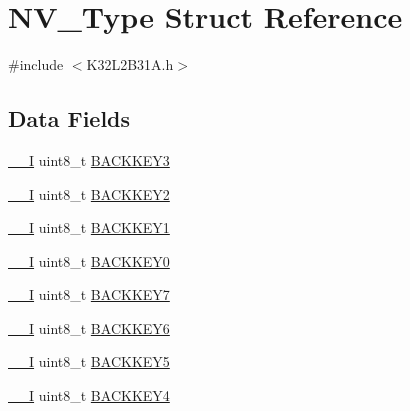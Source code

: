 \hypertarget{struct_n_v___type}{}\section{N\+V\+\_\+\+Type Struct Reference}
\label{struct_n_v___type}


{\ttfamily \#include $<$K32\+L2\+B31\+A.\+h$>$}

\subsection*{Data Fields}
\begin{DoxyCompactItemize}
\item 
\mbox{\hyperlink{core__cm0plus_8h_af63697ed9952cc71e1225efe205f6cd3}{\+\_\+\+\_\+I}} uint8\+\_\+t \mbox{\hyperlink{struct_n_v___type_a7d27c275caa809e8b950cb9fb1f52ea5}{B\+A\+C\+K\+K\+E\+Y3}}
\item 
\mbox{\hyperlink{core__cm0plus_8h_af63697ed9952cc71e1225efe205f6cd3}{\+\_\+\+\_\+I}} uint8\+\_\+t \mbox{\hyperlink{struct_n_v___type_ae0ad5dd66c2109955a90e1a6f4720a43}{B\+A\+C\+K\+K\+E\+Y2}}
\item 
\mbox{\hyperlink{core__cm0plus_8h_af63697ed9952cc71e1225efe205f6cd3}{\+\_\+\+\_\+I}} uint8\+\_\+t \mbox{\hyperlink{struct_n_v___type_a42fa40dda0fa3aee0b861bdf6ffa1eae}{B\+A\+C\+K\+K\+E\+Y1}}
\item 
\mbox{\hyperlink{core__cm0plus_8h_af63697ed9952cc71e1225efe205f6cd3}{\+\_\+\+\_\+I}} uint8\+\_\+t \mbox{\hyperlink{struct_n_v___type_aa0da3d6ede3a90b0697a300ddf18cd65}{B\+A\+C\+K\+K\+E\+Y0}}
\item 
\mbox{\hyperlink{core__cm0plus_8h_af63697ed9952cc71e1225efe205f6cd3}{\+\_\+\+\_\+I}} uint8\+\_\+t \mbox{\hyperlink{struct_n_v___type_ae3df2dcb7a5f33570f8cc15cc8126810}{B\+A\+C\+K\+K\+E\+Y7}}
\item 
\mbox{\hyperlink{core__cm0plus_8h_af63697ed9952cc71e1225efe205f6cd3}{\+\_\+\+\_\+I}} uint8\+\_\+t \mbox{\hyperlink{struct_n_v___type_a3076fe0bf30cde224dfb9c944d517de0}{B\+A\+C\+K\+K\+E\+Y6}}
\item 
\mbox{\hyperlink{core__cm0plus_8h_af63697ed9952cc71e1225efe205f6cd3}{\+\_\+\+\_\+I}} uint8\+\_\+t \mbox{\hyperlink{struct_n_v___type_aa4ca5b627931a03b02c1d4ac01e664d5}{B\+A\+C\+K\+K\+E\+Y5}}
\item 
\mbox{\hyperlink{core__cm0plus_8h_af63697ed9952cc71e1225efe205f6cd3}{\+\_\+\+\_\+I}} uint8\+\_\+t \mbox{\hyperlink{struct_n_v___type_a925e5cd64e47102087d0a66af786a626}{B\+A\+C\+K\+K\+E\+Y4}}
\item 

\end{DoxyCompactItemize}
